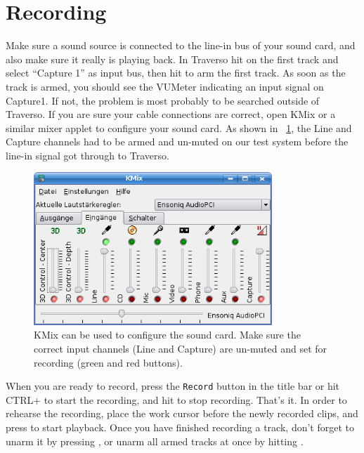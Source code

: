\section{Recording}
Make sure a sound source is connected to the line-in bus of your sound card, and also make sure it really is playing back. In Traverso hit  on the first track and select ``Capture 1'' as input bus, then hit  to arm the first track. As soon as the track is armed, you should see the VUMeter indicating an input signal on Capture1. If not, the problem is most probably to be searched outside of Traverso. If you are sure your cable connections are correct, open KMix or a similar mixer applet to configure your sound card. As shown in \FigT\ \ref{fig_kmix01}, the Line and Capture channels had to be armed and un-muted on our test system before the line-in signal got through to Traverso.

\begin{figure}
 \centering\includegraphics[width=0.8\textwidth]{images/kmix01.png}
 \caption{KMix can be used to configure the sound card. Make sure the correct input channels (Line and Capture) are un-muted and set for recording (green and red buttons).}
 \label{fig_kmix01}
\end{figure}

When you are ready to record, press the \texttt{Record} button in the title bar or hit CTRL+ to start the recording, and hit  to stop recording. That's it. In order to rehearse the recording, place the work cursor before the newly recorded clips, and press  to start playback. Once you have finished recording a track, don't forget to unarm it by pressing , or unarm all armed tracks at once by hitting .


